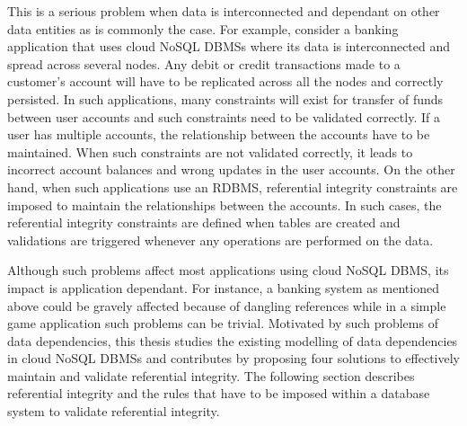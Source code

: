 This is a serious problem when data is interconnected and dependant on other
data entities as is commonly the case.  For example,   consider a banking
application that uses cloud \ac{NoSQL} \acp{DBMS} where its data is
interconnected and spread across several nodes.  Any debit or credit
transactions made to a customer's account will have to be replicated across all
the nodes and correctly persisted. In such applications, many constraints will
exist for transfer of funds between user accounts and such constraints need to
be validated correctly.
 If a user has multiple accounts,   the relationship between the accounts have
to be maintained.
When such constraints are not validated correctly,   it leads to incorrect
account balances and wrong updates in the user accounts.  On the other hand,  
when such applications use an \ac{RDBMS}, referential integrity constraints are
imposed to maintain the relationships between the accounts. In such cases, the
referential integrity constraints are defined when tables are created and
validations are triggered whenever any operations are performed on the data.

Although such problems  affect most applications using cloud \ac{NoSQL}
\ac{DBMS}, its impact is application dependant.  For instance,
a banking system as mentioned above could be gravely affected because of
dangling references while in a simple game application such problems can be
trivial.
Motivated by such problems of data dependencies, this thesis studies the
existing modelling of data dependencies in cloud \ac{NoSQL} \acp{DBMS} and
contributes by proposing four solutions to effectively maintain and validate
referential integrity.
The following section describes referential integrity and the rules that have to
be imposed within a database system to validate referential integrity.
